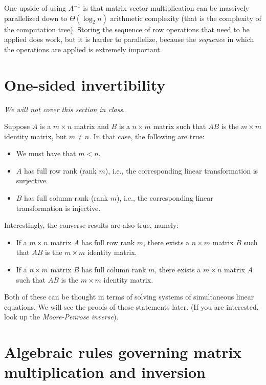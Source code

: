 \documentclass[10pt]{amsart}
\begin{document}
One upside of using $A^{-1}$ is that matrix-vector multiplication can
be massively parallelized down to $\Theta(\log_2 n)$ arithmetic
complexity (that is the complexity of the computation tree). Storing
the sequence of row operations that need to be applied does work, but
it is harder to parallelize, because the {\em sequence} in which the
operations are applied is extremely important.

\section{One-sided invertibility}

{\em We will not cover this section in class}.

Suppose $A$ is a $m \times n$ matrix and $B$ is a $n \times m$ matrix
such that $AB$ is the $m \times m$ identity matrix, but $m \ne n$. In
that case, the following are true:

\begin{itemize}
\item We must have that $m < n$.
\item $A$ has full row rank (rank $m$), i.e., the corresponding linear
  transformation is surjective.
\item $B$ has full column rank (rank $m$), i.e., the corresponding
  linear transformation is injective.
\end{itemize}

Interestingly, the converse results are also true, namely:

\begin{itemize}
\item If a $m \times n$ matrix $A$ has full row rank $m$, there exists
  a $n \times m$ matrix $B$ such that $AB$ is the $m \times m$
  identity matrix.
\item If a $n \times m$ matrix $B$ has full column rank $m$, there
  exists a $m \times n$ matrix $A$ such that $AB$ is the $m \times m$
  identity matrix.
\end{itemize}

Both of these can be thought in terms of solving systems of
simultaneous linear equations. We will see the proofs of these
statements later. (If you are interested, look up the {\em
  Moore-Penrose inverse}).
\section{Algebraic rules governing matrix multiplication and inversion}
\end{document}
